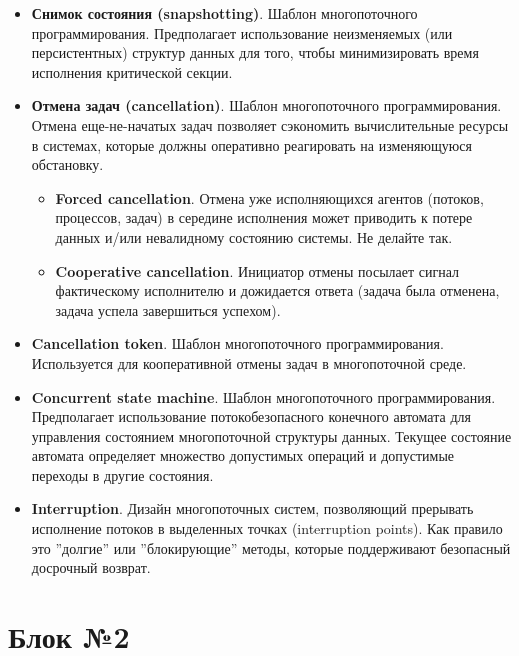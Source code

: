 \documentclass[a4paper, 12pt]{extarticle}
\begin{document}
\begin{itemize}
	\item \textbf{Снимок состояния (snapshotting)}. Шаблон многопоточного программирования. Предполагает использование неизменяемых (или персистентных) структур данных для того, чтобы минимизировать время исполнения критической секции. 

	\item \textbf{Отмена задач (cancellation)}. Шаблон многопоточного программирования. Отмена еще-не-начатых задач позволяет сэкономить вычислительные ресурсы в системах, которые должны оперативно реагировать на изменяющуюся обстановку.
	\begin{itemize}
		\item \textbf{Forced cancellation}. Отмена уже исполняющихся агентов (потоков, процессов, задач) в середине исполнения может приводить к потере данных и/или невалидному состоянию системы. Не делайте так.
		
		\item \textbf{Cooperative cancellation}. Инициатор отмены посылает сигнал фактическому исполнителю и дожидается ответа (задача была отменена, задача успела завершиться успехом).
	\end{itemize}

	\item \textbf{Cancellation token}. Шаблон многопоточного программирования. Используется для кооперативной отмены задач в многопоточной среде.

	\item \textbf{Concurrent state machine}. Шаблон многопоточного программирования. Предполагает использование потокобезопасного конечного автомата для управления состоянием многопоточной структуры данных. Текущее состояние автомата определяет множество допустимых операций и допустимые переходы в другие состояния.

	\item \textbf{Interruption}. Дизайн многопоточных систем, позволяющий прерывать исполнение потоков в выделенных точках (interruption points). Как правило это ''долгие'' или ''блокирующие'' методы, которые поддерживают безопасный досрочный возврат.


\end{itemize}

\newpage

\section{Блок №2}
\end{document}
